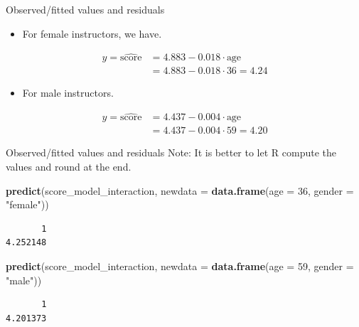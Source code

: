 \documentclass[
  ignorenonframetext,
]{beamer}
\newenvironment{Shaded}{\begin{snugshade}}{\end{snugshade}}
\newcommand{\AttributeTok}[1]{\textcolor[rgb]{0.13,0.29,0.53}{#1}}
\newcommand{\DecValTok}[1]{\textcolor[rgb]{0.00,0.00,0.81}{#1}}
\newcommand{\FunctionTok}[1]{\textcolor[rgb]{0.13,0.29,0.53}{\textbf{#1}}}
\newcommand{\NormalTok}[1]{#1}
\newcommand{\StringTok}[1]{\textcolor[rgb]{0.31,0.60,0.02}{#1}}
\providecommand{\tightlist}{%
  \setlength{\itemsep}{0pt}\setlength{\parskip}{0pt}}
\begin{document}
\begin{frame}{Observed/fitted values and residuals}
\protect\hypertarget{observedfitted-values-and-residuals-2}{}
\begin{itemize}
\tightlist
\item
  For female instructors, we have.
\end{itemize}

\[\begin{array}{ll}
\hat{y}=\widehat{\text{score}}&=4.883-0.018\cdot \text{age}\\
&=4.883-0.018\cdot 36=4.24
\end{array}\]

\begin{itemize}
\tightlist
\item
  For male instructors.
\end{itemize}

\[\begin{array}{ll}
\hat{y}=\widehat{\text{score}}&=4.437-0.004\cdot \text{age}\\
&=4.437-0.004\cdot 59=4.20
\end{array}\]
\end{frame}

\begin{frame}[fragile]{Observed/fitted values and residuals}
\protect\hypertarget{observedfitted-values-and-residuals-3}{}
Note: It is better to let R compute the values and round at the end.

\normalsize

\begin{Shaded}
\begin{Highlighting}[]
\FunctionTok{predict}\NormalTok{(score\_model\_interaction, }
        \AttributeTok{newdata =} \FunctionTok{data.frame}\NormalTok{(}\AttributeTok{age =} \DecValTok{36}\NormalTok{, }\AttributeTok{gender =} \StringTok{"female"}\NormalTok{))}
\end{Highlighting}
\end{Shaded}

\begin{verbatim}
       1 
4.252148 
\end{verbatim}

\begin{Shaded}
\begin{Highlighting}[]
\FunctionTok{predict}\NormalTok{(score\_model\_interaction, }
        \AttributeTok{newdata =} \FunctionTok{data.frame}\NormalTok{(}\AttributeTok{age =} \DecValTok{59}\NormalTok{, }\AttributeTok{gender =} \StringTok{"male"}\NormalTok{))}
\end{Highlighting}
\end{Shaded}

\begin{verbatim}
       1 
4.201373 
\end{verbatim}

\normalsize
\end{frame}
\end{document}
